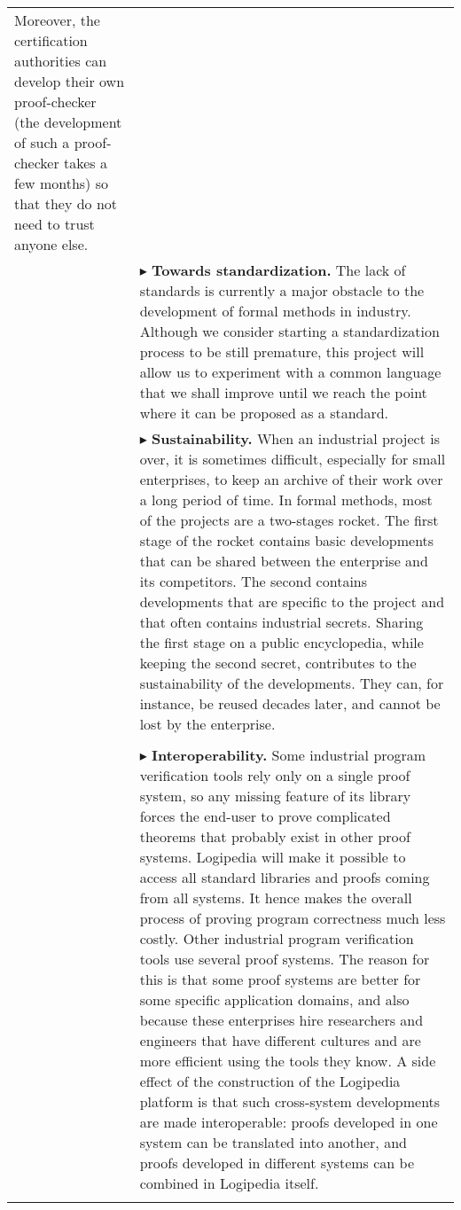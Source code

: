 \begin{longtable}{|p{}|p{}|}
Moreover, the certification authorities can develop their own
proof-checker (the development of such a proof-checker takes a few
months) so that they do not need to trust anyone else.\\
&
$\blacktriangleright$
{\bf Towards standardization.}
The lack of standards is currently a major obstacle to the development
of formal methods in industry. Although we consider starting a
standardization process to be still premature, this project will allow us
to experiment with a common language that we shall improve until we
reach the point where it can be proposed as a standard.\\
&
$\blacktriangleright$
{\bf Sustainability.}
When an industrial project is over, it is sometimes difficult,
especially for small enterprises, to keep an archive of their work over
a long period of time. In formal methods, most of the projects are a
two-stages rocket. The first stage of the rocket contains basic
developments that can be shared between the enterprise and its
competitors. The second contains developments that are specific to the
project and that often contains industrial secrets.
Sharing the first stage on a public encyclopedia, while keeping the
second secret, contributes to the sustainability of the
developments. They can, for instance, be reused decades later, and
cannot be lost by the enterprise.\\
&\\
&
$\blacktriangleright$
{\bf Interoperability.}
  Some industrial program verification tools rely only on a single
  proof system, so any missing feature of its library forces the
  end-user to prove complicated theorems that probably exist in other
  proof systems. Logipedia will make it possible to access all
  standard libraries and proofs coming from all systems. It hence
  makes the overall process of proving program correctness much less costly.
  Other industrial program verification tools use several proof
  systems. The reason for this is that some proof systems are better for some
  specific application domains, and also
  because these enterprises hire researchers and engineers that have
  different cultures and are more efficient using the tools they know.
  A side effect of the construction of the Logipedia platform is that
  such cross-system developments are made interoperable: proofs
  developed in one system can be translated into another, and
  proofs developed in different systems can be combined in
  Logipedia itself.\\
&\\

\end{longtable}
